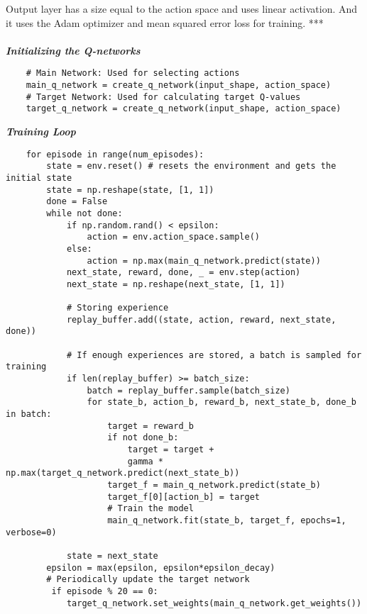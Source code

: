\documentclass{report}
\begin{document}
Output layer has a size equal to the action space and uses linear activation.
And it uses the Adam optimizer and mean squared error loss for training. *** \\ \\
\textbf{\textit{Initializing the Q-networks}}
\begin{lstlisting}
    # Main Network: Used for selecting actions
    main_q_network = create_q_network(input_shape, action_space)
    # Target Network: Used for calculating target Q-values
    target_q_network = create_q_network(input_shape, action_space)
\end{lstlisting}
\textbf{\textit{Training Loop}}
\begin{lstlisting}
    for episode in range(num_episodes):
        state = env.reset() # resets the environment and gets the initial state
        state = np.reshape(state, [1, 1])
        done = False
        while not done:
            if np.random.rand() < epsilon:
                action = env.action_space.sample()  
            else:
                action = np.max(main_q_network.predict(state))  
            next_state, reward, done, _ = env.step(action)
            next_state = np.reshape(next_state, [1, 1])
            
            # Storing experience
            replay_buffer.add((state, action, reward, next_state, done))

            # If enough experiences are stored, a batch is sampled for training
            if len(replay_buffer) >= batch_size:
                batch = replay_buffer.sample(batch_size)
                for state_b, action_b, reward_b, next_state_b, done_b in batch:
                    target = reward_b
                    if not done_b:
                        target = target +
                        gamma * np.max(target_q_network.predict(next_state_b))
                    target_f = main_q_network.predict(state_b)
                    target_f[0][action_b] = target
                    # Train the model
                    main_q_network.fit(state_b, target_f, epochs=1, verbose=0)

            state = next_state
        epsilon = max(epsilon, epsilon*epsilon_decay)
        # Periodically update the target network
         if episode % 20 == 0:
            target_q_network.set_weights(main_q_network.get_weights())

\end{lstlisting}
\newpage
\end{document}
